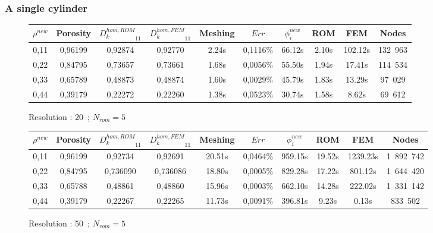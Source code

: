 \subsubsection{A single cylinder}

\begin{figure}[H]%
%
\begin{center}
\begin{tabular}{|c|c||c|c||c|c||c|c||c||c|}
\hline
\rowcolor{lightgray} $\rho^{new}$&Porosity&${D_k^{hom,ROM}}_{11}$&${D_k^{hom,FEM}}_{11}$&Meshing&$Err$&$\phi_i^{new}$&ROM&FEM&Nodes\\
\hline
0,11&0,96199&0,92874&0,92770&2.24s&0,1116\%&66.12s&2.10s&102.12s&132\ 963\\
\hline
0,22&0,84795&0,73657&0,73661&1.68s&0,0056\%&55.50s&1.94s&17.41s&114\ 534\\
\hline
0,33&0,65789&0,48873&0,48874&1.60s&0,0029\%&45.79s&1.83s&13.29s&97\ 029\\
\hline
0,44&0,39179&0,22272&0,22260&1.38s&0,0523\%&30.74s&1.58s&8.62s&69\ 612\\
\hline
\end{tabular}
\end{center}
\caption{Resolution : $20$\ ; $N_{rom}=5$}
%
\end{figure}

\begin{figure}[H]%
%
\begin{center}
\begin{tabular}{|c|c||c|c||c|c||c|c||c||c|}
\hline
\rowcolor{lightgray} $\rho^{new}$&Porosity&${D_k^{hom,ROM}}_{11}$&${D_k^{hom,FEM}}_{11}$&Meshing&$Err$&$\phi_i^{new}$&ROM&FEM&Nodes\\
\hline
0,11&0,96199&0,92734&0,92691&20.51s&0,0464\%&959.15s&19.52s&1239.23s&1\ 892\ 742\\
\hline
0,22&0,84795&0,736090&0,736086&18.80s&0,0005\%&829.28s&17.22s&801.12s&1\ 644\ 420\\
\hline
0,33&0,65788&0,48861&0,48860&15.96s&0,0003\%&662.10s&14.28s&222.02s&1\ 331\ 142\\
\hline
0,44&0,39179&0,22267&0,22265&11.73s&0,0091\%&396.81s&9.23s&0.13s&833\ 502\\
\hline
\end{tabular}
\end{center}
\caption{Resolution : $50$\ ; $N_{rom}=5$}
%
\end{figure}

\ligneinter

